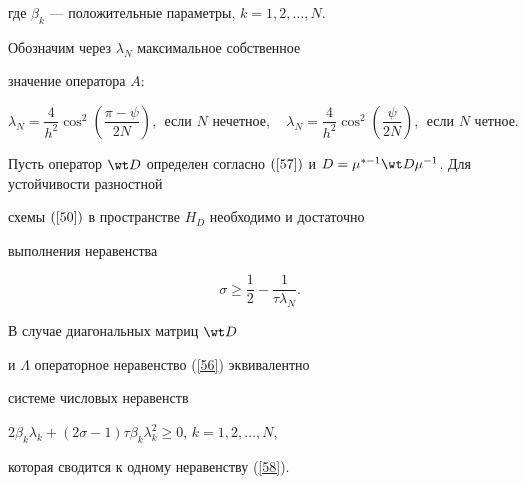 где $\beta_k $ --- положительные параметры, $k=1,2,\dotsc,N$.


Обозначим через $\lambda_N $ максимальное собственное


значение оператора $A$:


$$


\lambda_N=\frac{4} {{h^2}}\cos ^2 \left({\frac{{\pi-\psi


}} {{2N}}} \right),\ \ \text{если $N$ нечетное},\quad


\lambda_N=\frac{4} {{h^2}}\cos ^2 \left({\frac{\psi}


{{2N}}} \right),\ \ \text{если $N$ четное}.


$$





\begin{thm}\label{theorem6}


Пусть оператор ${\wt D}$ определен согласно $(\ref{57})$ и $D=


\mu ^{*-1} \wt D\mu ^{- 1} $. Для устойчивости разностной


схемы $(\ref{50})$ в пространстве $H_{D}$ необходимо и достаточно


выполнения неравенства


\begin{equation}\label{58}


\sigma \geqslant \frac{1} {2}-\frac{1} {{\tau \lambda_N}}.


\end{equation}


\end{thm}





\begin{pf}


В случае диагональных матриц ${\wt D}$


и $\Lambda $ операторное неравенство (\ref{56}) эквивалентно


системе числовых неравенств


$2\beta_k \lambda_k+(2\sigma-1)\tau \beta_k \lambda_k^2


\geqslant 0$, $k=1,2,\dotsc,N$,


которая сводится к одному неравенству (\ref{58}).


\end{pf}









